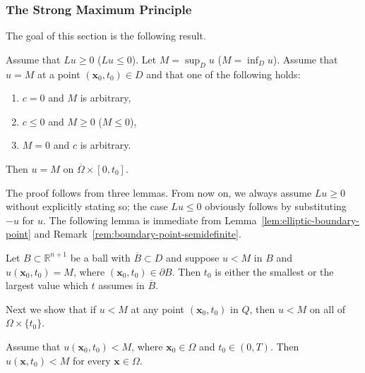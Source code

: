 \subsubsection{The Strong Maximum Principle}\label{subsec:parabolic-strong-maximum}

The goal of this section is the following result.

\begin{Theorem}
\label{thm:parabolic-strong-maximum}
Assume that $Lu\geq0$ ($Lu\leq0$). Let $M=\sup_Du$ ($M=\inf_Du$). Assume that $u=M$ at a point $(\bm{x}_0,t_0)\in D$ and that one of the following holds:
\begin{enumerate}
\item $c=0$ and $M$ is arbitrary,
\item $c\leq0$ and $M\geq0$ ($M\leq0$),
\item $M=0$ and $c$ is arbitrary.
\end{enumerate}
Then $u=M$ on $\overline\Omega\times[0,t_0]$.
\end{Theorem}

The proof follows from three lemmas. From now on, we always assume $Lu\geq0$ without explicitly stating so; the case $Lu\leq0$ obviously follows by substituting $-u$ for $u$. The following lemma is immediate from Lemma~\ref{lem:elliptic-boundary-point} and Remark~\ref{rem:boundary-point-semidefinite}.

\begin{Lemma}
\label{lem:parabolic-ball-extreme-time}
Let $B\subset\mathbb{R}^{n+1}$ be a ball with $\overline B\subset D$ and suppose $u<M$ in $B$ and $u(\bm{x}_0,t_0)=M$, where $(\bm{x}_0,t_0)\in\partial B$. Then $t_0$ is either the smallest or the largest value which $t$ assumes in $\overline B$.
\end{Lemma}

Next we show that if $u<M$ at any point $(\bm{x}_0,t_0)$ in $Q$, then $u<M$ on all of $\Omega\times\{t_0\}$.

\begin{Lemma}
\label{lem:parabolic-slice-strictness}
Assume that $u(\bm{x}_0,t_0)<M$, where $\bm{x}_0\in\Omega$ and $t_0\in(0,T)$. Then $u(\bm{x},t_0)<M$ for every $\bm{x}\in\Omega$.
\end{Lemma}

